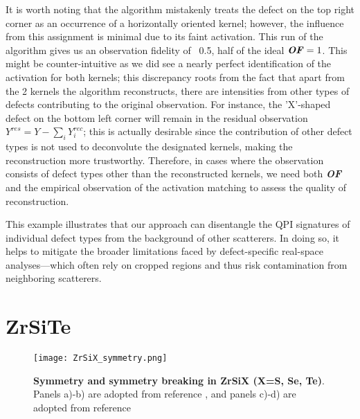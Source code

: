 It is worth noting that the algorithm mistakenly treats the defect on the top right corner as an occurrence of a horizontally oriented kernel; however, the influence from this assignment is minimal due to its faint activation. This run of the algorithm gives us an observation fidelity of ~0.5, half of the ideal $\textbf{\textit{OF}} =1$. This might be counter-intuitive as we did see a nearly perfect identification of the activation for both kernels; this discrepancy roots from the fact that apart from the 2 kernels the algorithm reconstructs, there are intensities from other types of defects contributing to the original observation. For instance, the 'X'-shaped defect on the bottom left corner will remain in the residual observation $Y^{res} = Y - \sum_i Y_i^{rec}$; this is actually desirable since the contribution of other defect types is not used to deconvolute the designated kernels, making the reconstruction more trustworthy. Therefore, in cases where the observation consists of defect types other than the reconstructed kernels, we need both \textbf{\textit{OF}} and the empirical observation of the activation matching to assess the quality of reconstruction.  

This example illustrates that our approach can disentangle the QPI signatures of individual defect types from the background of other scatterers. In doing so, it helps to mitigate the broader limitations faced by defect-specific real-space analyses—which often rely on cropped regions and thus risk contamination from neighboring scatterers.

\section{ZrSiTe}
\begin{figure}
	\texttt{[image: ZrSiX\_symmetry.png]} 
	\centering
	\caption[\textbf{Symmetry and symmetry breaking in ZrSiX (X=S, Se, Te)}]{\textbf{Symmetry and symmetry breaking in ZrSiX (X=S, Se, Te)}. Panels a)-b) are adopted from reference \cite{stuartScanningTunnellingMicroscopy2021}, and panels c)-d) are adopted from reference \cite{toppSurfaceFloating2D2017}}
	\label{fig:ZrSiX_symm}
\end{figure}
